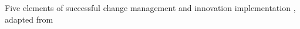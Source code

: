 \label{fig:implementation} Five elements of successful change management and innovation implementation \cite{ADEC2016}, adapted from \cite{Thousand2001}